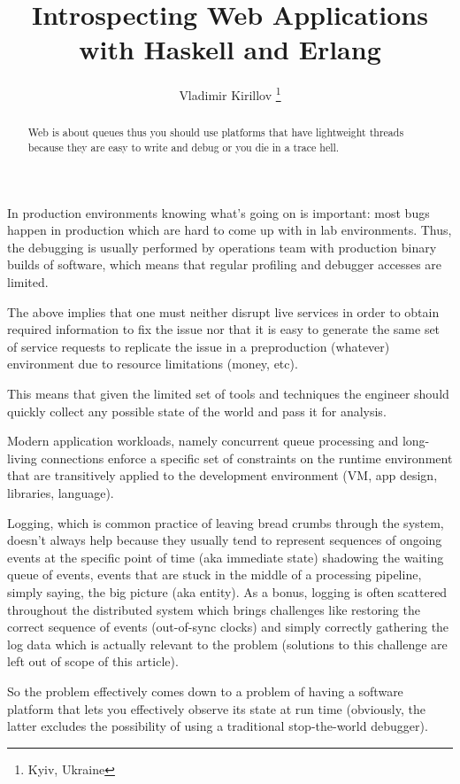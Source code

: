 \documentclass[10pt, a5paper]{article}
\begin{document}
\title{Introspecting Web Applications with Haskell and Erlang}
\author{Vladimir Kirillov \footnote{Kyiv, Ukraine}}
\maketitle

\begin{abstract}
Web is about queues thus you should use platforms that have lightweight threads because they are easy to write and debug or you die in a trace hell.
\end{abstract}

In production environments knowing what's going on is important: most bugs happen in production which are hard to come up with in lab environments. Thus, the debugging is usually performed by operations team with production binary builds of software, which means that regular profiling and debugger accesses are limited.

The above implies that one must neither disrupt live services in order to obtain required information to fix the issue nor that it is easy to generate the same set of service requests to replicate the issue in a preproduction (whatever) environment due to resource limitations (money, etc).

This means that given the limited set of tools and techniques the engineer should quickly collect any possible state of the world and pass it for analysis.

Modern application workloads, namely concurrent queue processing and long-living connections enforce a specific set of constraints on the runtime environment that are transitively applied to the development environment (VM, app design, libraries, language).

Logging, which is  common practice of leaving bread crumbs through the system, doesn't always help because they usually tend to represent sequences of ongoing events at the specific point of time (aka immediate state) shadowing the waiting queue of events, events that are stuck in the middle of a processing pipeline, simply saying, the big picture (aka entity). As a bonus, logging is often scattered throughout the distributed system which brings challenges like restoring the correct sequence of events (out-of-sync clocks) and simply correctly gathering the log data which is actually relevant to the problem (solutions to this challenge are left out of scope of this article).

So the problem effectively comes down to a problem of having a software platform that lets you effectively observe its state at run time (obviously, the latter excludes the possibility of using a traditional stop-the-world debugger).
\end{document}
